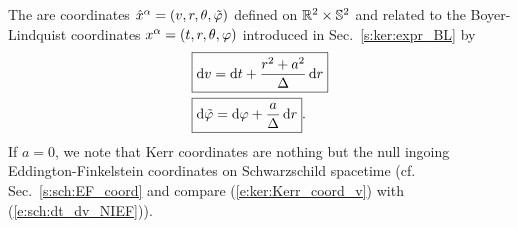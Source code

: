 The  are coordinates
$\hat{x}^\alpha = (v,r,\theta,{\tilde\varphi})$ defined on $\mathbb{R}^2\times\mathbb{S}^2$ and related to the Boyer-Lindquist coordinates
$x^\alpha = (t,r,\theta,\varphi)$ introduced in Sec.~\ref{s:ker:expr_BL} by
\begin{subequations}
\label{e:ker:Kerr_coord}
\begin{align}
& \fbox{$\displaystyle \mathrm{d} v = \mathrm{d} t + \frac{r^2+a^2}{\Delta} \, \mathrm{d} r$} \label{e:ker:Kerr_coord_v}\\
& \fbox{$\displaystyle \mathrm{d} {\tilde\varphi} = \mathrm{d} \varphi + \frac{a}{\Delta}\, \mathrm{d} r$} . \label{e:ker:Kerr_coord_tph}
\end{align}
\end{subequations}
If $a=0$, we note that Kerr coordinates are nothing but the null
ingoing Eddington-Finkelstein
coordinates on Schwarzschild spacetime (cf. Sec.~\ref{s:sch:EF_coord} and compare
(\ref{e:ker:Kerr_coord_v}) with (\ref{e:sch:dt_dv_NIEF})).

